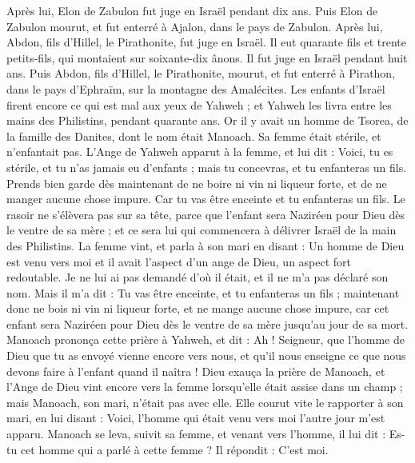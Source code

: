 \begin{multicols}{2}
Après lui, Elon de Zabulon fut juge en Israël pendant dix ans.
Puis Elon de Zabulon mourut, et fut enterré à Ajalon, dans le pays de Zabulon.
Après lui, Abdon, fils d'Hillel, le Pirathonite, fut juge en Israël.
Il eut quarante fils et trente petits-fils, qui montaient sur soixante-dix ânons. Il fut juge en  Israël pendant huit ans.
Puis Abdon, fils d'Hillel, le Pirathonite, mourut, et fut enterré à Pirathon, dans le pays d'Ephraïm, sur la montagne des Amalécites.
\VerseOne{}Les enfants d'Israël firent encore ce qui est mal aux yeux de Yahweh ; et Yahweh les livra entre les mains des Philistins, pendant quarante ans.
Or il y avait un homme de Tsorea, de la famille des Danites, dont le nom était Manoach. Sa femme était stérile, et n'enfantait pas.
L’Ange de Yahweh apparut à la femme, et lui dit : Voici, tu es stérile, et tu n'as jamais eu d'enfants ; mais tu concevras, et tu enfanteras un fils.
Prends bien garde dès maintenant de ne boire ni vin ni liqueur forte, et de ne manger aucune chose impure.
Car tu vas être enceinte et tu enfanteras un fils. Le rasoir ne s'élèvera pas sur sa tête, parce que l'enfant sera Naziréen pour Dieu dès le ventre de sa mère ; et ce sera lui qui commencera à délivrer Israël de la main des Philistins.
La femme vint, et parla à son mari en disant : Un homme de Dieu est venu vers moi et il avait l'aspect d'un ange de Dieu, un aspect fort redoutable. Je ne lui ai pas demandé d'où il était, et il ne m'a pas déclaré son nom.
Mais il m'a dit : Tu vas être enceinte, et tu enfanteras un fils ;  maintenant donc ne bois ni vin ni liqueur forte, et ne mange aucune chose impure, car cet enfant sera Naziréen pour Dieu dès le ventre de sa mère jusqu'au jour de sa mort.
Manoach prononça cette prière à Yahweh, et dit : Ah !  Seigneur, que l'homme de Dieu que tu as envoyé vienne encore vers nous, et qu'il nous enseigne ce que nous devons faire à l'enfant quand il naîtra !
Dieu exauça la prière de Manoach, et l'Ange de Dieu vint encore vers la femme lorsqu'elle était assise dans un champ ; mais Manoach, son mari, n'était pas avec elle.
Elle courut vite le rapporter à son mari, en lui disant : Voici, l'homme qui était venu vers moi l'autre jour m'est apparu.
Manoach se leva, suivit sa femme, et venant vers l'homme, il lui dit : Es-tu cet homme qui a parlé à cette femme ? Il répondit : C'est moi.

\end{multicols}

